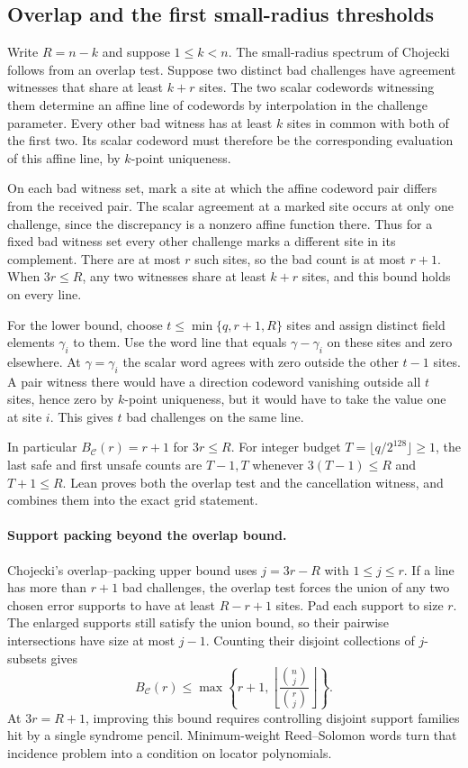 \subsection{Overlap and the first small-radius thresholds}
\label{sec:mca-overlap}

Write \(R=n-k\) and suppose \(1\le k<n\). The small-radius spectrum of
Chojecki \cite{chojecki2026thresholds} follows from an overlap test.
Suppose two distinct bad challenges have agreement witnesses that share
at least \(k+r\) sites. The two scalar codewords witnessing them determine
an affine line of codewords by interpolation in the challenge parameter.
Every other bad witness has at least \(k\) sites in common with both of
the first two. Its scalar codeword must therefore be the corresponding
evaluation of this affine line, by \(k\)-point uniqueness.

On each bad witness set, mark a site at which the affine codeword pair
differs from the received pair. The scalar agreement at a marked site
occurs at only one challenge, since the discrepancy is a nonzero affine
function there. Thus for a fixed bad witness set every other challenge
marks a different site in its complement. There are at most \(r\) such
sites, so the bad count is at most \(r+1\). When \(3r\le R\), any two
witnesses share at least \(k+r\) sites, and this bound holds on every line.

For the lower bound, choose \(t\le\min\{q,r+1,R\}\) sites and assign
distinct field elements \(\gamma_i\) to them. Use the word line that
equals \(\gamma-\gamma_i\) on these sites and zero elsewhere. At
\(\gamma=\gamma_i\) the scalar word agrees with zero outside the other
\(t-1\) sites. A pair witness there would have a direction codeword
vanishing outside all \(t\) sites, hence zero by \(k\)-point uniqueness,
but it would have to take the value one at site \(i\). This gives \(t\)
bad challenges on the same line.

In particular \(B_{\mathcal C}(r)=r+1\) for \(3r\le R\). For integer
budget \(T=\lfloor q/2^{128}\rfloor\ge1\), the last safe and first unsafe
counts are \(T-1,T\) whenever \(3(T-1)\le R\) and \(T+1\le R\).
Lean proves both the overlap test and the cancellation witness, and
combines them into the exact grid statement.

\paragraph{Support packing beyond the overlap bound.}
Chojecki's overlap--packing upper bound \cite{chojecki2026thresholds}
uses \(j=3r-R\) with \(1\le j\le r\). If a line has more than \(r+1\)
bad challenges, the overlap test forces the union of any two chosen error
supports to have at least \(R-r+1\) sites. Pad each support to size \(r\).
The enlarged supports still satisfy the union bound, so their pairwise
intersections have size at most \(j-1\). Counting their disjoint collections
of \(j\)-subsets gives
\[
 B_{\mathcal C}(r)\le
 \max\left\{r+1,\left\lfloor\frac{\binom{n}{j}}{\binom{r}{j}}\right\rfloor\right\}.
\]
At \(3r=R+1\), improving this bound requires controlling disjoint support
families hit by a single syndrome pencil. Minimum-weight Reed--Solomon
words turn that incidence problem into a condition on locator polynomials.

